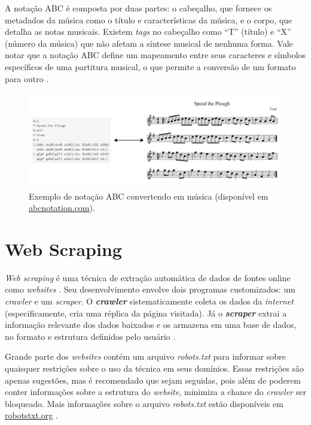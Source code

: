 \documentclass[twoside]{automatextcc}
\begin{document}
A notação ABC é composta por duas partes: o cabeçalho, que fornece os metadados da música como o título e características da música, e o corpo, que detalha as notas musicais. Existem \textit{tags} no cabeçalho como ``T'' (título) e ``X'' (número da música) que não afetam a síntese musical de nenhuma forma. Vale notar que a notação ABC define um mapeamento entre seus caracteres e símbolos específicos de uma partitura musical, o que permite a conversão de um formato para outro \citep{agarwala2017}. 

\begin{figure}[H]
    \centering
    \includegraphics[width=\textwidth]{figuras/abc_notation_example.pdf}
	\caption{Exemplo de notação ABC convertendo em música (disponível em \href{https://abcnotation.com}{\url{abcnotation.com}}).}
\end{figure}


\section{Web Scraping}
\textit{Web scraping} é uma técnica de extração automática de dados de fontes online como \textit{websites} \citep{farley2017,khder2021}. Seu desenvolvimento envolve dois programas customizados: um \textit{crawler} e um \textit{scraper}. O \textbf{\textit{crawler}} sistematicamente coleta os dados da \textit{internet} (especificamente, cria uma réplica da página visitada). Já o \textbf{\textit{scraper}} extrai a informação relevante dos dados baixados e os armazena em uma base de dados, no formato e estrutura definidos pelo usuário \citep{lawson2015,patil2016}.

Grande parte dos \textit{websites} contém um arquivo \textit{robots.txt} para informar sobre quaisquer restrições sobre o uso da técnica em seus domínios. Essas restrições são apenas sugestões, mas é recomendado que sejam seguidas, pois além de poderem conter informações sobre a estrutura do \textit{website}, minimiza a chance do \textit{crawler} ser bloqueado. Mais informações sobre o arquivo \textit{robots.txt} estão disponíveis em \url{robotstxt.org} \citep{lawson2015}.
\end{document}
